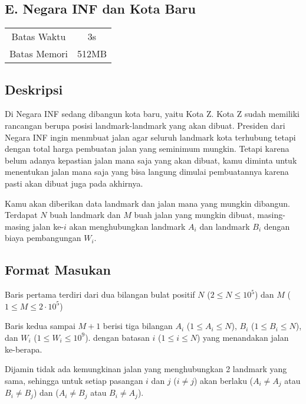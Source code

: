 \documentclass{article}
\begin{document}
\begin{center}
    \section*{E. Negara INF dan Kota Baru} %

    \begin{tabular}{ | c c | }
        \hline
        Batas Waktu  & 3s \\    %
        Batas Memori & 512MB \\  %
        \hline
    \end{tabular}
\end{center}

\subsection*{Deskripsi}

Di Negara INF sedang dibangun kota baru, yaitu Kota Z. Kota Z sudah memiliki rancangan berupa posisi landmark-landmark yang akan dibuat.
Presiden dari Negara INF ingin menmbuat jalan agar seluruh landmark kota terhubung tetapi dengan total harga pembuatan jalan yang seminimum mungkin. Tetapi karena belum adanya kepastian jalan mana saja yang akan dibuat, kamu diminta untuk menentukan jalan mana saja yang bisa langung dimulai pembuatannya karena pasti akan dibuat juga pada akhirnya.

Kamu akan diberikan data landmark dan jalan mana yang mungkin dibangun.
Terdapat $N$ buah landmark dan $M$ buah jalan yang mungkin dibuat, masing-masing jalan ke-$i$ akan menghubungkan landmark $A_i$ dan landmark $B_i$ dengan biaya pembangungan $W_i$.

\subsection*{Format Masukan}

Baris pertama terdiri dari dua bilangan bulat positif $N$ ($2 \leq N \leq 10^5$) dan $M$ ($1 \leq M \leq 2 \cdot 10^5$)

Baris kedua sampai $M + 1$ berisi tiga bilangan $A_i$ ($1 \leq A_i \leq N$), $B_i$ ($1 \leq B_i \leq N$), dan $W_i$ ($1 \leq W_i \leq 10^9$). dengan batasan $i$ ($1 \leq i \leq N$) yang menandakan jalan ke-berapa.

Dijamin tidak ada kemungkinan jalan yang menghubungkan 2 landmark yang sama, sehingga untuk setiap pasangan $i$ dan $j$ ($i \neq j$) akan berlaku ($A_i \neq A_j$ atau $B_i \neq B_j$) dan ($A_i \neq B_j$ atau $B_i \neq A_j$).
\end{document}
